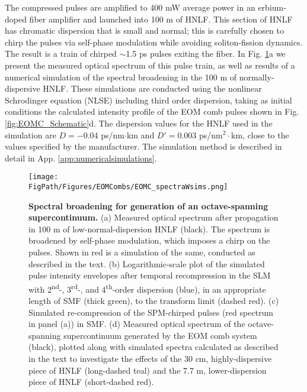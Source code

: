 The compressed pulses are amplified to 400 mW average power in an erbium-doped fiber amplifier and launched into 100 m of HNLF. This section of HNLF has chromatic dispersion that is small and normal; this is carefully chosen to chirp the pulses via self-phase modulation while avoiding soliton-fission dynamics\cite{Dudley2006}. The result is a train of chirped $\sim$1.5 ps pulses exiting the fiber.  In Fig. \ref{fig:EOMC_Broadening}a we present the measured optical spectrum of this pulse train, as well as results of a numerical simulation of the spectral broadening in the 100 m of normally-dispersive HNLF. These simulations are conducted using the nonlinear Schrodinger equation (NLSE) including third order dispersion\cite{Agrawal2007}, taking as initial conditions the calculated intensity profile of the EOM comb pulses shown in Fig. \ref{fig:EOMC_Schematic}d. The dispersion values for the HNLF used in the simulation are $D=-0.04$  ps/nm$\cdot$km and $D'=0.003$ ps/nm$^2\cdot$km, close to the values specified by the manufacturer. The simulation method is described in detail in App. \ref{app:numericalsimulations}.

\begin{figure}[htpb]
	\begin{center}
		\texttt{[image: \\FigPath/Figures/EOMCombs/EOMC\_spectraWsims.png]}
	\end{center}
	\caption[Figure Title]{\textbf{Spectral broadening for generation of an octave-spanning supercontinuum.} (a) Measured optical spectrum after propagation in 100 m of low-normal-dispersion HNLF (black). The spectrum is broadened by self-phase modulation, which imposes a chirp on the pulses. Shown in red is a simulation of the same, conducted as described in the text. (b) Logarithmic-scale plot of the simulated pulse intensity envelopes after temporal recompression in the SLM with 2\textsuperscript{nd}-, 3\textsuperscript{rd}-, and 4\textsuperscript{th}-order dispersion (blue), in an appropriate length of SMF (thick green), to the transform limit (dashed red). (c) Simulated re-compression of the SPM-chirped pulses (red spectrum in panel (a)) in SMF. (d) Measured optical spectrum of the octave-spanning supercontinuum generated by the EOM comb system (black), plotted along with simulated spectra calculated as described in the text to investigate the effects of the 30 cm, highly-dispersive piece of HNLF (long-dashed teal) and the 7.7 m, lower-dispersion piece of HNLF (short-dashed red).}
	\label{fig:EOMC_Broadening}
\end{figure} 


